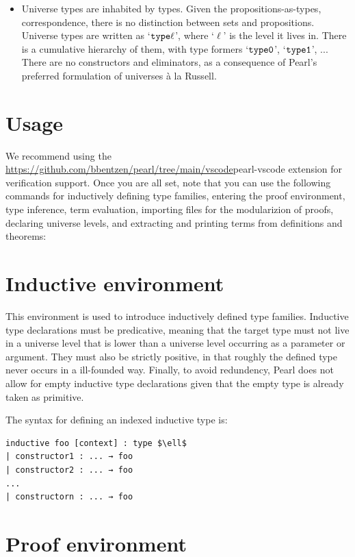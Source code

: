 \documentclass[a4paper]{article}
\begin{document}
\begin{itemize}
	\item Universe types are inhabited by types. Given the propositions-as-types, correspondence, there is no distinction between sets and propositions. Universe types are written as `$\mathtt{\mathtt{type} \ell}$', where `$\ell$' is the level it lives in. There is a cumulative hierarchy of them, with type formers `$\mathtt{\mathtt{type} 0}$', `$\mathtt{\mathtt{type} 1}$', ... There are
	no constructors and eliminators, as a consequence of Pearl's preferred
	formulation of universes à la Russell.
\end{itemize}

\section{Usage}

We recommend using the \href{URL}{https://github.com/bbentzen/pearl/tree/main/vscode}{pearl-vscode extension} for verification support. Once you are all set, note that you can use the following commands for inductively defining type families, entering the proof environment, type inference, term evaluation, importing files for the modularizion of proofs, declaring universe levels, and extracting and printing terms from definitions and theorems:

\section{Inductive environment}

This environment is used to introduce inductively defined type families. Inductive type declarations must be predicative, meaning that the target type must not live in a universe level that is lower than a universe level occurring as a parameter or argument. They must also be strictly positive, in that roughly the defined type never occurs in a ill-founded way. Finally, to avoid redundency, Pearl does not allow for empty inductive type declarations given that the empty type is already taken as primitive.

The syntax for defining an indexed inductive type is:

\begin{lstlisting}[style=pearl]
inductive foo [context] : type $\ell$
| constructor1 : ... → foo
| constructor2 : ... → foo
...
| constructorn : ... → foo
\end{lstlisting}



\section{Proof environment}
\end{document}
